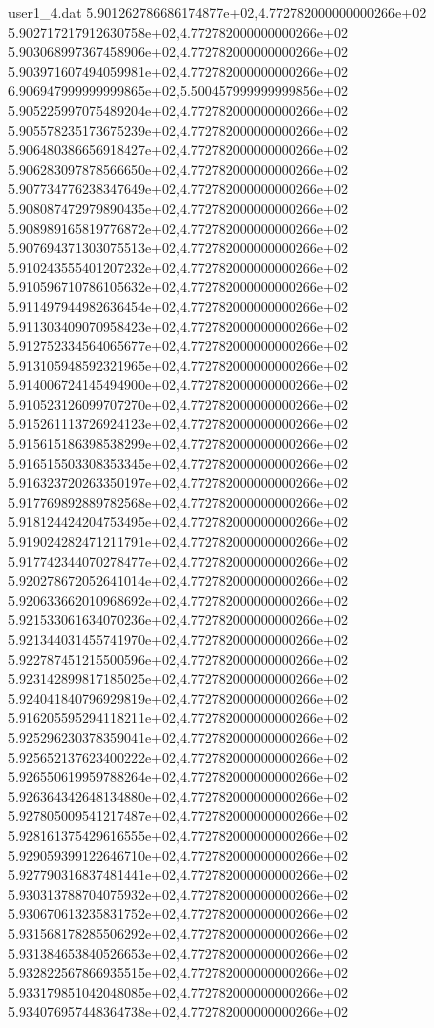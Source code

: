 \begin{filecontents}{user1_4.dat}
5.901262786686174877e+02,4.772782000000000266e+02
5.902717217912630758e+02,4.772782000000000266e+02
5.903068997367458906e+02,4.772782000000000266e+02
5.903971607494059981e+02,4.772782000000000266e+02
6.906947999999999865e+02,5.500457999999999856e+02
5.905225997075489204e+02,4.772782000000000266e+02
5.905578235173675239e+02,4.772782000000000266e+02
5.906480386656918427e+02,4.772782000000000266e+02
5.906283097878566650e+02,4.772782000000000266e+02
5.907734776238347649e+02,4.772782000000000266e+02
5.908087472979890435e+02,4.772782000000000266e+02
5.908989165819776872e+02,4.772782000000000266e+02
5.907694371303075513e+02,4.772782000000000266e+02
5.910243555401207232e+02,4.772782000000000266e+02
5.910596710786105632e+02,4.772782000000000266e+02
5.911497944982636454e+02,4.772782000000000266e+02
5.911303409070958423e+02,4.772782000000000266e+02
5.912752334564065677e+02,4.772782000000000266e+02
5.913105948592321965e+02,4.772782000000000266e+02
5.914006724145494900e+02,4.772782000000000266e+02
5.910523126099707270e+02,4.772782000000000266e+02
5.915261113726924123e+02,4.772782000000000266e+02
5.915615186398538299e+02,4.772782000000000266e+02
5.916515503308353345e+02,4.772782000000000266e+02
5.916323720263350197e+02,4.772782000000000266e+02
5.917769892889782568e+02,4.772782000000000266e+02
5.918124424204753495e+02,4.772782000000000266e+02
5.919024282471211791e+02,4.772782000000000266e+02
5.917742344070278477e+02,4.772782000000000266e+02
5.920278672052641014e+02,4.772782000000000266e+02
5.920633662010968692e+02,4.772782000000000266e+02
5.921533061634070236e+02,4.772782000000000266e+02
5.921344031455741970e+02,4.772782000000000266e+02
5.922787451215500596e+02,4.772782000000000266e+02
5.923142899817185025e+02,4.772782000000000266e+02
5.924041840796929819e+02,4.772782000000000266e+02
5.916205595294118211e+02,4.772782000000000266e+02
5.925296230378359041e+02,4.772782000000000266e+02
5.925652137623400222e+02,4.772782000000000266e+02
5.926550619959788264e+02,4.772782000000000266e+02
5.926364342648134880e+02,4.772782000000000266e+02
5.927805009541217487e+02,4.772782000000000266e+02
5.928161375429616555e+02,4.772782000000000266e+02
5.929059399122646710e+02,4.772782000000000266e+02
5.927790316837481441e+02,4.772782000000000266e+02
5.930313788704075932e+02,4.772782000000000266e+02
5.930670613235831752e+02,4.772782000000000266e+02
5.931568178285506292e+02,4.772782000000000266e+02
5.931384653840526653e+02,4.772782000000000266e+02
5.932822567866935515e+02,4.772782000000000266e+02
5.933179851042048085e+02,4.772782000000000266e+02
5.934076957448364738e+02,4.772782000000000266e+02

\end{filecontents}
